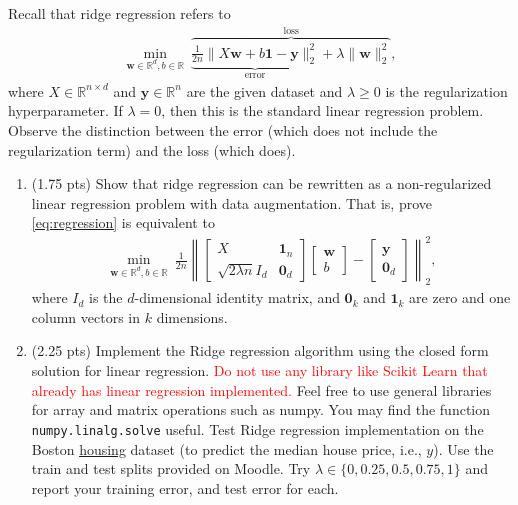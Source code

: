 \documentclass[10pt,letter,notitlepage]{article}
\newcommand{\RR}{\mathds{R}}
\newcommand{\zero}{\mathbf{0}}
\newcommand{\one}{\mathbf{1}}
\newcommand{\wv}{\mathbf{w}}
\newcommand{\yv}{\mathbf{y}}
\newcommand{\magenta}[1]{{\color{magenta}#1}}
\newcommand{\ie}{{i.e.}\xspace}
\newcounter{exercise}
\begin{document}
\begin{exercise}
Recall that ridge regression refers to
\begin{align}
  \min_{\wv\in \RR^d, b\in \RR} ~ \overbrace{\underbrace{\tfrac{1}{2n} \|X \wv+ b\one - \yv\|_2^2}_{\mbox{error}} + \lambda \|\wv\|_2^2}^{\mbox{loss}}, \label{eq:regression}
\end{align}
where $X \in \RR^{n \times d}$ and $\yv \in \RR^n$ are the given dataset and $\lambda \geq 0$ is the regularization hyperparameter.
If $\lambda = 0$, then this is the standard linear regression problem.
  Observe the distinction between the error (which does not include the regularization term) and the loss (which does).

\begin{enumerate}
  \item (1.75 pts) Show that ridge regression can be rewritten as a non-regularized linear regression problem with data augmentation. 
  That is, prove \ref{eq:regression} is equivalent to 
\begin{align}
  \min_{\wv\in \RR^d, b\in \RR} ~ \tfrac{1}{2n} \left\|\begin{bmatrix}
X & \one_n \\
    \sqrt{2\lambda n}I_d & \zero_d
    \end{bmatrix} \begin{bmatrix} \wv  \\ b\end{bmatrix}  - \begin{bmatrix}\yv \\ \zero_d\end{bmatrix}\right\|_2^2 , 
\end{align}
where $I_d$ is the $d$-dimensional identity matrix, and $\zero_k$ and $\one_k$ are zero and one column vectors in $k$ dimensions.

\item (2.25 pts) Implement the Ridge regression algorithm using the closed form solution for linear regression. \textcolor{red}{Do not use any library like Scikit Learn that already has linear regression implemented.} Feel free to use general libraries for array and matrix operations such as numpy. You may find the function \texttt{numpy.linalg.solve} useful. Test Ridge regression implementation on the Boston \href{http://lib.stat.cmu.edu/datasets/boston}{\textsf{\magenta{housing}}} dataset (to predict the median house price, \ie, $y$). Use the train and test splits provided on Moodle. Try $\lambda \in \{0, 0.25, 0.5, 0.75, 1\}$ and report your training error, and test error for each. 


\end{enumerate}
\end{exercise}
\end{document}
